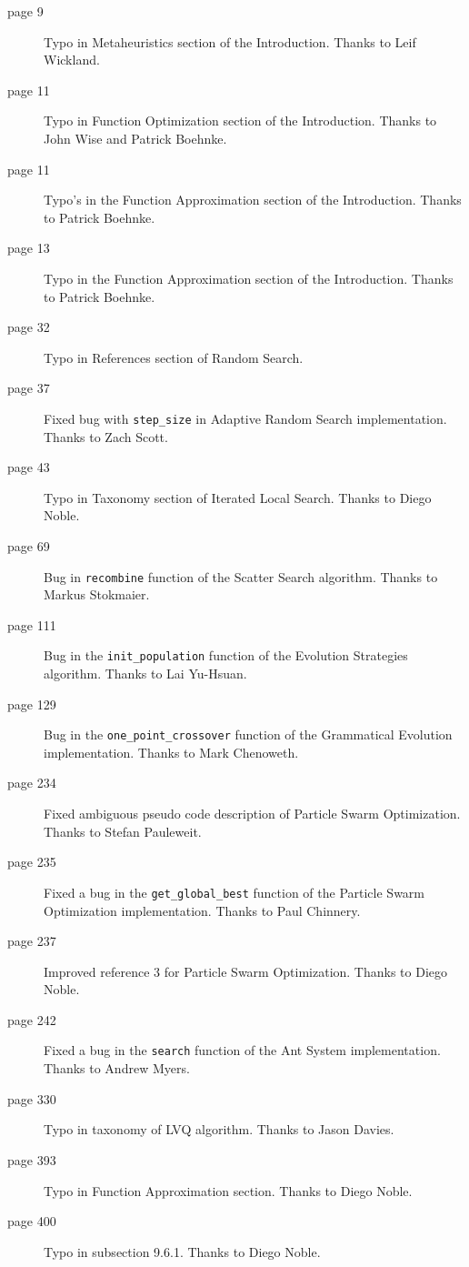 \begin{small}
	
\begin{description}
	\item[page 9] Typo in Metaheuristics section of the Introduction. Thanks to Leif Wickland.
	\item[page 11] Typo in Function Optimization section of the Introduction. Thanks to John Wise and Patrick Boehnke.
	\item[page 11] Typo's in the Function Approximation section of the Introduction. Thanks to Patrick Boehnke.
	\item[page 13] Typo in the Function Approximation section of the Introduction. Thanks to Patrick Boehnke.
	\item[page 32] Typo in References section of Random Search.
  \item[page 37] Fixed bug with \texttt{step\_size} in Adaptive Random Search implementation. Thanks to Zach Scott.
	\item[page 43] Typo in Taxonomy section of Iterated Local Search. Thanks to Diego Noble.
	\item[page 69] Bug in \texttt{recombine} function of the Scatter Search algorithm. Thanks to Markus Stokmaier.
	\item[page 111] Bug in the \texttt{init\_population} function of the Evolution Strategies algorithm. Thanks to Lai Yu-Hsuan.
	\item[page 129] Bug in the \texttt{one\_point\_crossover} function of the Grammatical Evolution implementation. Thanks to Mark Chenoweth.
	\item[page 234] Fixed ambiguous pseudo code description of Particle Swarm Optimization. Thanks to Stefan Pauleweit.
	\item[page 235] Fixed a bug in the \texttt{get\_global\_best} function of the Particle Swarm Optimization implementation. Thanks to Paul Chinnery.
	\item[page 237] Improved reference 3 for Particle Swarm Optimization. Thanks to Diego Noble.
	\item[page 242] Fixed a bug in the \texttt{search} function of the Ant System implementation. Thanks to Andrew Myers.
	\item[page 330] Typo in taxonomy of LVQ algorithm. Thanks to Jason Davies.
	\item[page 393] Typo in Function Approximation section. Thanks to Diego Noble.
	\item[page 400] Typo in subsection 9.6.1. Thanks to Diego Noble.

\end{description}
\end{small}
